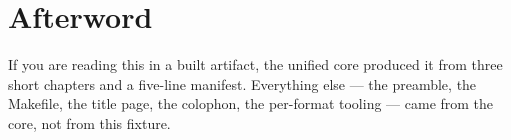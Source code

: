 \chapter*{Afterword}

If you are reading this in a built artifact, the unified core produced it from
three short chapters and a five-line manifest. Everything else --- the preamble,
the Makefile, the title page, the colophon, the per-format tooling --- came from
the core, not from this fixture.
